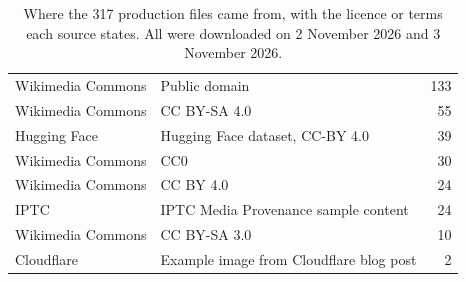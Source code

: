 \begin{table}[ht]
\caption{Where the 317 production files came from, with the licence or terms each source states. All were downloaded on 2 November 2026 and 3 November 2026.}
\label{tab:corpussrc}
\small
\begin{tabular}{llr}
\toprule
\footnotesize
Wikimedia Commons & Public domain & 133\\
Wikimedia Commons & CC BY-SA 4.0 & 55\\
Hugging Face & Hugging Face dataset, CC-BY 4.0 & 39\\
Wikimedia Commons & CC0 & 30\\
Wikimedia Commons & CC BY 4.0 & 24\\
IPTC & IPTC Media Provenance sample content & 24\\
Wikimedia Commons & CC BY-SA 3.0 & 10\\
Cloudflare & Example image from Cloudflare blog post & 2\\
\bottomrule
\end{tabular}
\end{table}
